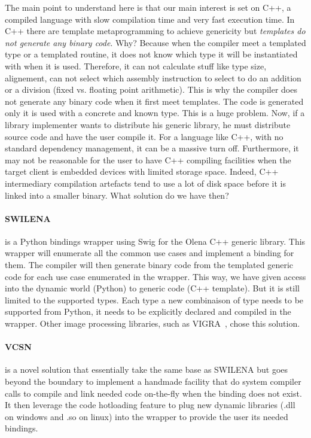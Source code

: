 The main point to understand here is that our main interest is set on C++, a compiled language with slow compilation
time and very fast execution time. In C++ there are template metaprogramming to achieve genericity but \emph{templates
  do not generate any binary code}. Why? Because when the compiler meet a templated type or a templated routine, it does
not know which type it will be instantiated with when it is used. Therefore, it can not calculate stuff like type size,
alignement, can not select which assembly instruction to select to do an addition or a division (fixed vs. floating
point arithmetic). This is why the compiler does not generate any binary code when it first meet templates. The code is
generated only it is used with a concrete and known type. This is a huge problem. Now, if a library implementer wants to
distribute his generic library, he must distribute source code and have  the user compile it. For a language like C++,
with no standard dependency management, it can be a massive turn off. Furthermore, it may not be reasonable for the user
to have C++ compiling facilities when the target client is embedded devices with limited storage space. Indeed, C++
intermediary compilation artefacts tend to use a lot of disk space before it is linked into a smaller binary. What
solution do we have then?

\paragraph{SWILENA~\parencite{beazley.1996.swig,olena.2000.www}} is a Python bindings wrapper using Swig for the Olena
C++ generic library. This wrapper will enumerate all the common use cases and implement a binding for them. The compiler
will then generate binary code from the templated generic code for each use case enumerated in the wrapper. This way, we
have given access into the dynamic world (Python) to generic code (C++ template). But it is still limited to the
supported types. Each type a new combinaison of type needs to be supported from Python, it needs to be explicitly
declared and compiled in the wrapper. Other image processing libraries, such as VIGRA~\parencite{kothe.2011.generic},
chose this solution.

\paragraph{VCSN~\parencite{demaille.2013.vcsn}} is a novel solution that essentially take the same base as SWILENA but
goes beyond the boundary to implement a handmade facility that do system compiler calls to compile and link needed code
on-the-fly when the binding does not exist. It then leverage the code hotloading feature to plug new dynamic libraries
(.dll on windows and .so on linux) into the wrapper to provide the user its needed bindings.

